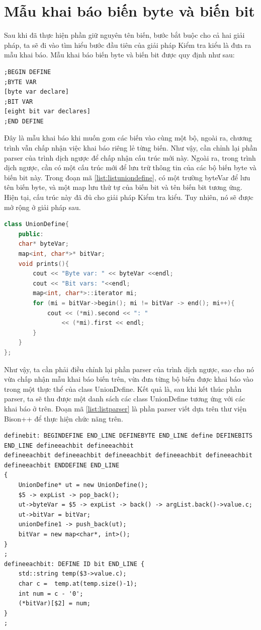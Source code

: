\section{Mẫu khai báo biến byte và biến bit}
Sau khi đã thực hiện phần giữ nguyên tên biến, bước bắt buộc cho cả hai giải pháp, ta sẽ đi vào tìm hiểu bước đầu tiên của giải pháp Kiểm tra kiểu là đưa ra mẫu khai báo. Mẫu khai báo biến byte và biến bit được quy định như sau:
\begin{lstlisting}[caption={Mẫu khai báo bộ biến},label={list:listdeclarevar}]
;BEGIN DEFINE
;BYTE VAR
[byte var declare]
;BIT VAR
[eight bit var declares]
;END DEFINE
\end{lstlisting}
Đây là mẫu khai báo khi muốn gom các biến vào cùng một bộ, ngoài ra, chương trình vẫn chấp nhận việc khai báo riêng lẻ từng biến. Như vậy, cần chỉnh lại phần parser của trình dịch ngược để chấp nhận cấu trúc mới này. Ngoài ra, trong trình dịch ngược, cần có một cấu trúc mới để lưu trữ thông tin của các bộ biến byte và biến bit này. Trong đoạn mã \ref{list:listuniondefine}, có một trường byteVar để lưu tên biến byte, và một map lưu thứ tự của biến bit và tên biến bit tương ứng. Hiện tại, cấu trúc này đã đủ cho giải pháp Kiểm tra kiểu. Tuy nhiên, nó sẽ được mở rộng ở giải pháp sau. 
\begin{lstlisting}[caption={Cấu trúc dữ liệu để lưu trữ một bộ biến},label={list:listuniondefine},language=c++]
class UnionDefine{
	public:
	char* byteVar;
	map<int, char*>* bitVar;
	void prints(){
		cout << "Byte var: " << byteVar <<endl;
		cout << "Bit vars: "<<endl;
		map<int, char*>::iterator mi;
		for (mi = bitVar->begin(); mi != bitVar -> end(); mi++){
			cout << (*mi).second << ": " 
				<< (*mi).first << endl;
		}
	}
};
\end{lstlisting}
Như vậy, ta cần phải điều chỉnh lại phần parser của trình dịch ngược, sao cho nó vừa chấp nhận mẫu khai báo biến trên, vừa đưa từng bộ biến được khai báo vào trong một thực thể của class UnionDefine. Kết quả là, sau khi kết thúc phần parser, ta sẽ thu được một danh sách các class UnionDefine tương ứng với các khai báo ở trên. Đoạn mã \ref{list:listparser} là phần parser viết dựa trên thư viện Bison++ để thực hiện chức năng trên.\\
\begin{lstlisting}[caption={Đoạn mã parser cho phần khai báo bộ biến},label={list:listparser}]
definebit: BEGINDEFINE END_LINE DEFINEBYTE END_LINE define DEFINEBITS END_LINE defineeachbit defineeachbit
defineeachbit defineeachbit defineeachbit defineeachbit defineeachbit defineeachbit ENDDEFINE END_LINE
{
	UnionDefine* ut = new UnionDefine();
	$5 -> expList -> pop_back();
	ut->byteVar = $5 -> expList -> back() -> argList.back()->value.c;
	ut->bitVar = bitVar;
	unionDefine1 -> push_back(ut);
	bitVar = new map<char*, int>();
}
;
defineeachbit: DEFINE ID bit END_LINE {
	std::string temp($3->value.c);
	char c =  temp.at(temp.size()-1);
	int num = c - '0';
	(*bitVar)[$2] = num;
}
;
\end{lstlisting}
